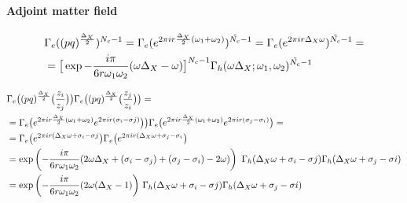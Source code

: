 \begin{appendices}
\paragraph{Adjoint matter field}

\begin{equation}
\begin{aligned}
& \Gamma_e((pq)^{\frac{\Delta_X}{2}})^{N_c -1} =
\Gamma_e( e^{2 \pi i r  {\Delta_X \over 2} (\omega_1 + \omega_2)})^{\tilde{N_c}-1} =  \Gamma_e( e^{2 \pi i r  \Delta_X \omega })^{\tilde{N_c}-1} = \\
&=\big[ \exp{- \frac{i \pi} {6 r \omega_1 \omega_2 }  ( \omega \Delta_X - \omega) }\big]^{N_c-1} \Gamma_h ( \omega \Delta_X ; \omega_1, \omega_2)^{\tilde{N_c}-1}
\end{aligned}
\end{equation}



 \begin{equation}
 \begin{aligned}
 & \Gamma_e\big( (pq)^{\frac{\Delta_X}{2}} \big( { z_i \over z_j} \big) \big) \Gamma_e \big( (pq)^{\frac{\Delta_X}{2}} \big( { z_j \over z_i} \big) \big) = \\
&= \Gamma_e\big( e^{2 \pi i r \frac{\Delta_X}{2} (\omega_1 + \omega_2)} e^{ 2 \pi  i r (\sigma_i - \sigma j)} \big) \big) \Gamma_e \big( e^{ 2 \pi i r \frac{\Delta_X}{2} (\omega_1 + \omega_2)}  e^{ 2 \pi i r (\sigma_j - \sigma_i)} \big) =  \\
&= \Gamma_e\big( e^{2 \pi  i r (\Delta_X \omega +\sigma_i - \sigma j} \big) \Gamma_e \big(  e^{2 \pi  i r (\Delta_X \omega +\sigma_j - \sigma_i} \big) \\
 & = \exp \left( {- \frac{i \pi} {6 r \omega_1 \omega_2 }  ( 2 \omega \Delta_X + (\sigma_i - \sigma_j)+(\sigma_j - \sigma_i) - 2 \omega) }\right)\, \, \Gamma_h ( \Delta_X \omega + \sigma_i - \sigma j ) \Gamma_h ( \Delta_X \omega + \sigma_j - \sigma i) \\
 & = \exp\left({- \frac{i \pi} {6 r \omega_1 \omega_2 }  ( 2 \omega (\Delta_X - 1) }\right)  \, \Gamma_h ( \Delta_X \omega + \sigma_i - \sigma j ) \Gamma_h ( \Delta_X \omega + \sigma_j - \sigma i)
\end{aligned}
\end{equation}




\end{appendices}
